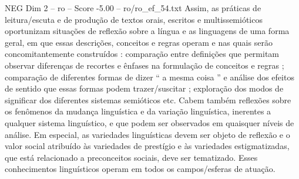 \begin{textsample}{NEG Dim 2 – ro – Score -5.00 – ro/ro\_ef\_54.txt}
Assim, as práticas de leitura/escuta e de produção de textos orais, escritos e multissemióticos oportunizam situações de reflexão sobre a língua e as linguagens de uma forma geral, em que essas descrições, conceitos e regras operam e nas quais serão concomitantemente construídos : comparação entre definições que permitam observar diferenças de recortes e ênfases na formulação de conceitos e regras ; comparação de diferentes formas de dizer “ a mesma coisa ” e análise dos efeitos de sentido que essas formas podem trazer/suscitar ; exploração dos modos de significar dos diferentes sistemas semióticos etc.
Cabem também reflexões sobre os fenômenos da mudança linguística e da variação linguística, inerentes a qualquer sistema linguístico, e que podem ser observados em quaisquer níveis de análise.
Em especial, as variedades linguísticas devem ser objeto de reflexão e o valor social atribuído às variedades de prestígio e às variedades estigmatizadas, que está relacionado a preconceitos sociais, deve ser tematizado.
Esses conhecimentos linguísticos operam em todos os campos/esferas de atuação.

\end{textsample}
